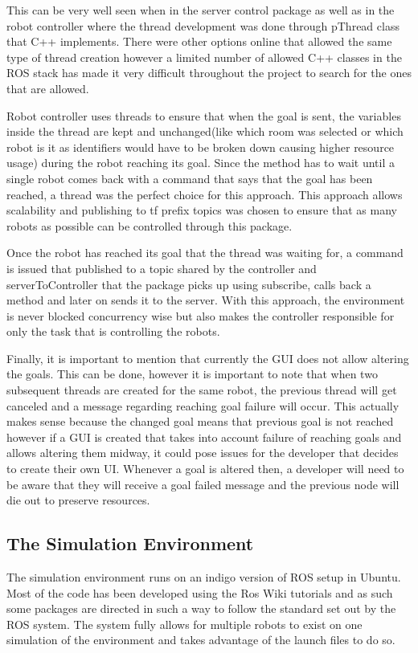       This can be very well seen when in the server control package as well as in the robot controller where the thread development was done through pThread class that C++ implements. There were other options online that allowed the same type of thread creation however a limited number of allowed C++ classes in the ROS stack has made it very difficult throughout the project to search for the ones that are allowed.

      Robot controller uses threads to ensure that when the goal is sent, the variables inside the thread are kept and unchanged(like which room was selected or which robot is it as identifiers would have to be broken down causing higher resource usage) during the robot reaching its goal. Since the method has to wait until a single robot comes back with a command that says that the goal has been reached, a thread was the perfect choice for this approach. This approach allows scalability and publishing to tf prefix topics was chosen to ensure that as many robots as possible can be controlled through this package.

      Once the robot has reached its goal that the thread was waiting for, a command is issued that published to a topic shared by the controller and serverToController that the package picks up using subscribe, calls back a method and later on sends it to the server. With this approach, the environment is never blocked concurrency wise but also makes the controller responsible for only the task that is controlling the robots.

      Finally, it is important to mention that currently the GUI does not allow altering the goals. This can be done, however it is important to note that when two subsequent threads are created for the same robot, the previous thread will get canceled and a message regarding reaching goal failure will occur. This actually makes sense because the changed goal means that previous goal is not reached however if a GUI is created that takes into account failure of reaching goals and allows altering them midway, it could pose issues for the developer that decides to create their own UI. Whenever a goal is altered then, a developer will need to be aware that they will receive a goal failed message and the previous node will die out to preserve resources.

    \subsection{The Simulation Environment}
      The simulation environment runs on an indigo version of ROS setup in Ubuntu. Most of the code has been developed using the Ros Wiki tutorials and as such some packages are directed in such a way to follow the standard set out by the ROS system. The system fully allows for multiple robots to exist on one simulation of the environment and takes advantage of the launch files to do so.

